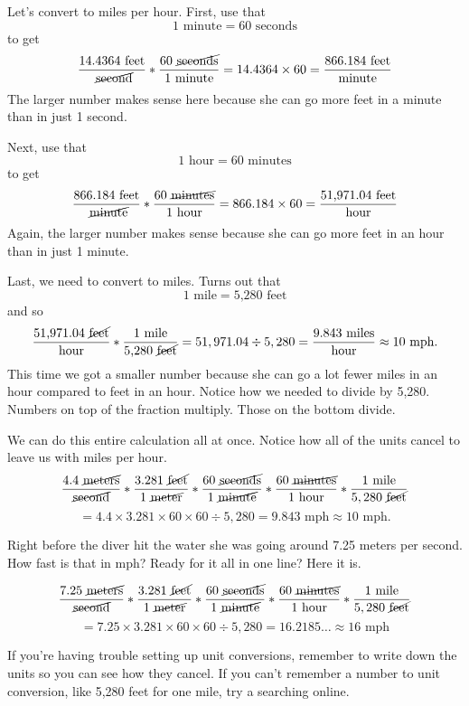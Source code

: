 Let's convert to miles per hour.  First, use that
$$1 \text{ minute} = 60 \text{ seconds}$$ to get
$$ \frac{14.4364  \text{ feet}}{\text{ \cancel{second}}} \ast \frac{60 \text{  \cancel{seconds}}}{1\text{ minute}} =  14.4364 \times 60 = \frac{866.184 \text{ feet}}{\text{minute}}$$ 
The larger number makes sense here because she can go more feet in a minute than in just 1 second.  

Next, use that
$$1 \text{ hour} = 60 \text{ minutes}$$ to get
$$ \frac{866.184 \text{ feet}}{\text{ \cancel{minute}}}\ast  \frac{60 \text{ \cancel{minutes}}}{1\text{ hour}} = 866.184 \times 60 = \frac{ \text{51,971.04 feet}}{\text{hour}}$$  
Again, the larger number makes sense because she can go more feet in an hour than in just 1 minute.  

Last, we need to convert to miles.  Turns out that 
$$1 \text{ mile} = \text{5,280 feet}$$ and so
$$ \frac{ \text{51,971.04 \cancel{feet}}}{\text{hour}}\ast  \frac{1 \text{ mile}}{\text{5,280 \cancel{feet}}} = 51,971.04 \div 5,280 = \frac{9.843 \text{ miles}}{\text{hour}} \approx 10 \text{ mph}.$$  
This time we got a smaller number because she can go a lot fewer miles in an hour compared to feet in an hour.  Notice how we needed to divide by 5,280.  Numbers on top of the fraction multiply. Those on the bottom divide.  %

We can do this entire calculation all at once.  Notice how all of the units cancel to leave us with miles per hour.  $$ \frac{4.4 \text{ \cancel{meters}}}{\text{\cancel{second}}} \ast \frac{3.281 \text{ \cancel{feet}}}{1 \text{ \cancel{meter}}}  \ast \frac{60 \text{ \cancel{seconds}}}{1 \text{ \cancel{minute}}}\ast  \frac{60 \text{ \cancel{minutes}}}{1\text{ hour}}\ast  \frac{1 \text{ mile}}{5,280\text{ \cancel{feet}}} $$
$$= 4.4 \times 3.281 \times 60 \times 60 \div 5,280 = 9.843 \text{ mph} \approx 10 \text{ mph}.$$  

Right before the diver hit the water she was going around 7.25 meters per second.  How fast is that in mph? Ready for it all in one line?  Here it is.

$$ \frac{7.25 \text{ \cancel{meters}}}{\text{\cancel{second}}} \ast \frac{3.281 \text{ \cancel{feet}}}{1 \text{ \cancel{meter}}}  \ast \frac{60 \text{ \cancel{seconds}}}{1 \text{ \cancel{minute}}}\ast  \frac{60 \text{ \cancel{minutes}}}{1\text{ hour}}\ast  \frac{1 \text{ mile}}{5,280\text{ \cancel{feet}}} $$
$$=7.25 \times 3.281 \times 60 \times 60 \div 5,280 = 16.2185\ldots \approx 16 \text{ mph}$$

If you're having trouble setting up unit conversions, remember to write down the units so you can see how they cancel.  If you can't remember a number to unit conversion, like 5,280 feet for one mile, try a searching online.


%
